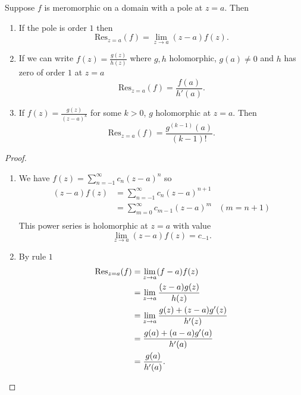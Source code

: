 \documentclass[10pt, a4paper]{article}
\begin{document}
\begin{proposition}
    Suppose $f$ is meromorphic on a domain with a pole at $z = a$.
    Then
    \begin{enumerate}[label = Rule \arabic*]
        \item If the pole is order $1$ then
        \[
        \mathrm{Res}_{z = a}(f) = \lim_{z \to a}(z - a)f(z).
        \]

        \item If we can write $f(z) = \frac{g(z)}{h(z)}$ where $g, h$ holomorphic,
        $g(a) \neq 0$ and $h$ has zero of order $1$ at $z = a$
        \[
        \mathrm{Res}_{z = a}(f) = \frac{f(a)}{h'(a)}.
        \]

        \item If $f(z) = \frac{g(z)}{(z - a) ^ k}$ for some $k > 0$,
        $g$ holomorphic at $z = a$.
        Then
        \[
        \mathrm{Res}_{z = a}(f) = \frac{g ^ {(k - 1)}(a)}{(k - 1)!}.
        \]
    \end{enumerate}

    \begin{proof}
        \begin{enumerate}[label = Rule \arabic*]
            \item We have $f(z) = \sum_{n = -1}^{\infty}c_n(z - a) ^ n$ so
            \begin{align*}
                (z - a)f(z) &= \sum_{n = -1}^{\infty}c_n(z - a) ^ {n + 1} \\
                &= \sum_{m = 0}^{\infty}c_{m - 1}(z - a) ^ m &(m = n + 1) \\
            \end{align*}
            This power series is holomorphic at $z = a$ with value
            \[
            \lim_{z \to a}(z - a)f(z) = c_{-1}.
            \]

            \item By rule $1$
            \begin{align*}
                \operatorname{Res}_{z = a}(f) &= \lim_{z \to a}(f - a)f(z) \\
                &= \lim_{z \to a}\frac{(z - a)g(z)}{h(z)} \\
                &= \lim_{z \to a}\frac{g(z) + (z - a)g'(z)}{h'(z)} \\
                &= \frac{g(a) + (a - a)g'(a)}{h'(a)} \\
                &= \frac{g(a)}{h'(a)}.
            \end{align*}


\end{enumerate}
\end{proof}
\end{proposition}
\end{document}
